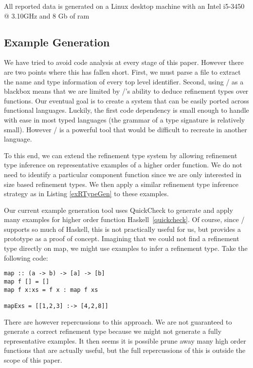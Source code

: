 All reported data is generated on a Linux desktop machine with an Intel i5-3450 @ 3.10GHz and 8 Gb of ram

\subsection{Example Generation}\label{languageSupport}

We have tried to avoid code analysis at every stage of this paper.
However there are two points where this has fallen short. 
First, we must parse a file to extract the name and type information of every top level identifier. 
Second, using \lhask/ as a blackbox means that we are limited by \lhask/'s ability to deduce refinement types over functions. 
Our eventual goal is to create a system that can be easily ported across functional languages. 
Luckily, the first code dependency is small enough to handle with ease in most typed languages (the grammar of a type signature is relatively small). However \lhask/ is a powerful tool that would be difficult to recreate in another language. 

To this end, we can extend the refinement type system by allowing refinement type inference on representative examples of a higher order function.
We do not need to identify a particular component function since we are only interested in size based refinement types.
We then apply a similar refinement type inference strategy as in Listing \ref{exRTypeGen} to these examples.

Our current example generation tool uses QuickCheck to generate and apply many examples for higher order function Haskell~\ref{quickcheck}.
Of course, since \lhask/ supports so much of Haskell, this is not practically useful for us, but provides a prototype as a proof of concept.
Imagining that we could not find a refinement type directly on map, we might use examples to infer a refinement type. Take the following code:

\begin{lstlisting}
map :: (a -> b) -> [a] -> [b]
map f [] = [] 
map f x:xs = f x : map f xs

mapExs = [[1,2,3] :-> [4,2,8]]
\end{lstlisting}

There are however repercussions to this approach. We are not guaranteed to generate a correct refinement type because we might not generate a fully representative examples. It then seems it is possible prune away many high order functions that are actually useful, but the full repercussions of this is outside the scope of this paper.


